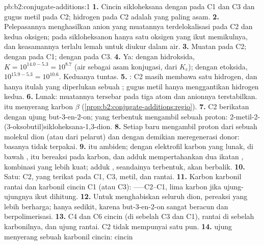 \begin{solution}{pb:b2:conjugate-additions:1}
\textbf{1.} Cincin sikloheksana dengan  pada C1 dan C3 dan gugus
metil pada C2; hidrogen pada C2 adalah yang paling asam.
\textbf{2.} Pelepasannya menghasilkan anion yang muatannya terdelokalisasi
pada C2 dan kedua oksigen; pada sikloheksanon hanya satu oksigen yang ikut
memikulnya, dan keasamannya terlalu lemah untuk diukur dalam air.
\textbf{3.} Muatan pada C2;  dengan  pada C1;  dengan  pada C3.
\textbf{4.} Ya: dengan hidroksida, $K = 10^{14.0 - 5.3} = 10^{8.7}$ (air
sebagai asam konjugasi, dari
$K_e$); dengan etoksida, $10^{15.9-5.3} = 10^{10.6}$. Keduanya tuntas.
\textbf{5.} : C2 masih membawa satu hidrogen, dan hanya
itulah yang diperlukan sebuah ; gugus metil hanya menggantikan hidrogen
kedua.
\textbf{6.} Lunak: muatannya tersebar pada tiga atom dan anionnya
terstabilkan.  itu menyerang karbon
$\beta$ (\cref{prop:b2:conjugate-additions:regio}).
\textbf{7.} C2  berikatan dengan ujung  but-3-en-2-on; 
yang terbentuk mengambil sebuah proton:
2-metil-2-(3-oksobutil)sikloheksana-1,3-dion.
\textbf{8.} Setiap  baru mengambil proton dari sebuah molekul dion
(atau dari pelarut) dan dengan demikian meregenerasi  donor: basanya
tidak terpakai.
\textbf{9.}  itu ambiden; dengan elektrofil karbon yang lunak, di bawah
,  itu bereaksi pada karbon, dan adduk 
mempertahankan dua ikatan , kombinasi yang lebih kuat; adduk
, seandainya terbentuk, akan berbalik.
\textbf{10.} Satu: C2, yang terikat pada C1, C3, metil, dan rantai.
\textbf{11.} Karbon karbonil rantai dan karbonil cincin C1 (atau C3): ------C2--C1,
lima karbon jika ujung-ujungnya ikut dihitung.
\textbf{12.} Untuk menghabiskan seluruh dion, pereaksi yang lebih berharga;
hanya sedikit, karena but-3-en-2-on sangat beracun dan berpolimerisasi.
\textbf{13.} C4 dan C6 cincin (di sebelah C3 dan C1),  rantai di
sebelah karbonilnya, dan  ujung rantai. C2 tidak mempunyai satu pun.
\textbf{14.}   ujung menyerang sebuah karbonil cincin: cincin

\end{solution}
